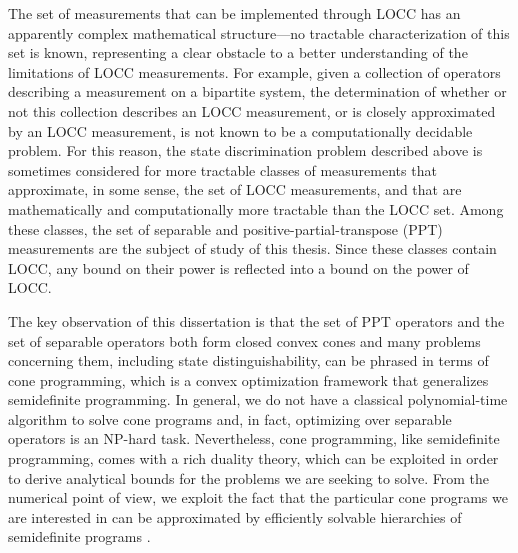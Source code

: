 The set of measurements that can be implemented through LOCC has an apparently
complex mathematical structure---no tractable characterization of this set is
known, representing a clear obstacle to a better understanding of the
limitations of LOCC measurements.
For example, given a collection of operators 
describing a measurement on a bipartite system, the determination of whether or
not this collection describes an LOCC measurement, or is closely approximated
by an LOCC measurement, is not known to be a computationally decidable
problem.
For this reason, the state discrimination problem described above is sometimes
considered for more tractable classes of measurements that approximate, in some
sense, the set of LOCC measurements, and that are mathematically and computationally 
more tractable than the LOCC set.
Among these classes, the set of separable and positive-partial-transpose (PPT) measurements 
are the subject of study of this thesis.
Since these classes contain LOCC, any bound on their power is reflected into a 
bound on the power of LOCC.

The key observation of this dissertation is that the set of PPT operators
and the set of separable operators both form closed convex cones and many problems concerning them, 
including state distinguishability, can be phrased in terms of cone programming,
which is a convex optimization framework that generalizes semidefinite programming.
In general, we do not have a classical polynomial-time algorithm to solve
cone programs and, in fact, optimizing over separable operators is an NP-hard task. 
Nevertheless, cone programming, like semidefinite programming, comes with a rich duality theory,
which can be exploited in order to derive analytical bounds for the problems we are seeking to solve.
From the numerical point of view, we exploit the fact that the particular cone programs
we are interested in can be approximated by efficiently solvable hierarchies of 
semidefinite programs \cite{Doherty02}.

